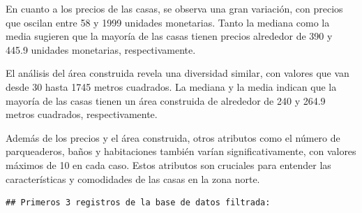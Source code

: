 \documentclass[
]{article}
\begin{document}
En cuanto a los precios de las casas, se observa una gran variación, con
precios que oscilan entre 58 y 1999 unidades monetarias. Tanto la
mediana como la media sugieren que la mayoría de las casas tienen
precios alrededor de 390 y 445.9 unidades monetarias, respectivamente.

El análisis del área construida revela una diversidad similar, con
valores que van desde 30 hasta 1745 metros cuadrados. La mediana y la
media indican que la mayoría de las casas tienen un área construida de
alrededor de 240 y 264.9 metros cuadrados, respectivamente.

Además de los precios y el área construida, otros atributos como el
número de parqueaderos, baños y habitaciones también varían
significativamente, con valores máximos de 10 en cada caso. Estos
atributos son cruciales para entender las características y comodidades
de las casas en la zona norte.

\begin{verbatim}
## Primeros 3 registros de la base de datos filtrada:
\end{verbatim}
\end{document}
